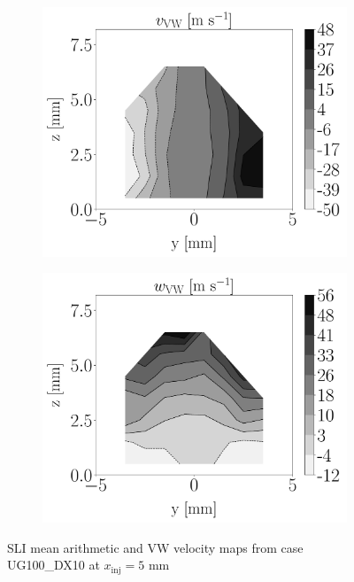 \begin{figure}[ht]
\begin{subfigure}[b]{0.2\textwidth}
\end{subfigure}
\hspace*{0.45in}
\begin{subfigure}[b]{0.2\textwidth}
	\flushleft
   \includegraphics[scale=0.19]{./part2_developments/figures_ch6_lagrangian_JICF/injectors_SLI/uG100_dx10_x05_uy_mean_vw_map}
\end{subfigure}
\hspace*{0.45in}
\begin{subfigure}[b]{0.2\textwidth}
	\flushleft
   \includegraphics[scale=0.19]{./part2_developments/figures_ch6_lagrangian_JICF/injectors_SLI/uG100_dx10_x05_uz_mean_vw_map}
\end{subfigure}

\caption{SLI mean arithmetic and VW velocity maps from case UG100\_DX10 at $x_\mathrm{inj} = 5$ mm }
\label{fig:maps_SLI_with_arithmetic_mean_and_VW}
\end{figure}


